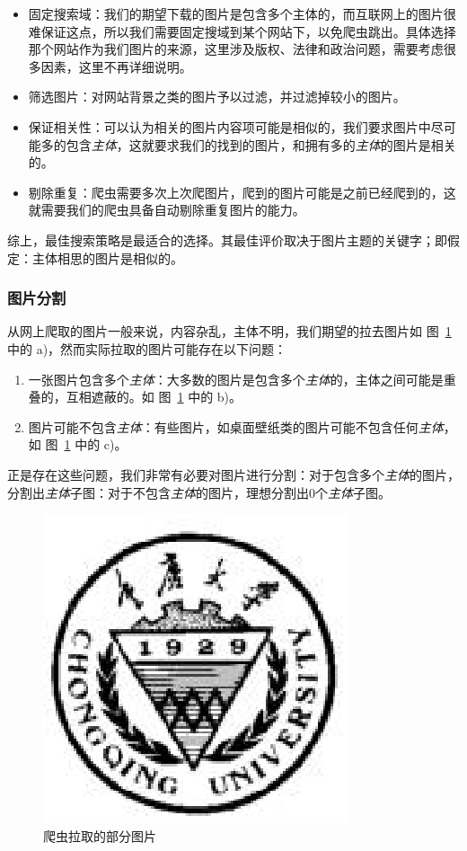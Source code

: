 \documentclass[bachelor,zhspacing]{cqu}  %
\begin{document}
\begin{itemize}
\item
  固定搜索域：我们的期望下载的图片是包含多个主体的，而互联网上的图片很难保证这点，所以我们需要固定搜域到某个网站下，以免爬虫跳出。具体选择那个网站作为我们图片的来源，这里涉及版权、法律和政治问题，需要考虑很多因素，这里不再详细说明。
\item
  筛选图片：对网站背景之类的图片予以过滤，并过滤掉较小的图片。
\item
  保证相关性：可以认为相关的图片内容项可能是相似的，我们要求图片中尽可能多的包含\emph{主体}，这就要求我们的找到的图片，和拥有多的\emph{主体}的图片是相关的。
\item
  剔除重复：爬虫需要多次上次爬图片，爬到的图片可能是之前已经爬到的，这就需要我们的爬虫具备自动剔除重复图片的能力。
\end{itemize}

综上，最佳搜索策略是最适合的选择。其最佳评价取决于图片主题的关键字；即假定：主体相思的图片是相似的。

\subsubsection{图片分割}\label{ux56feux7247ux5206ux5272}

从网上爬取的图片一般来说，内容杂乱，主体不明，我们期望的拉去图片如
图~\ref{fig:download-image} 中的
a)，然而实际拉取的图片可能存在以下问题：

\begin{enumerate}
\def\labelenumi{\arabic{enumi}.}
\item
  一张图片包含多个\emph{主体}：大多数的图片是包含多个\emph{主体}的，主体之间可能是重叠的，互相遮蔽的。如
  图~\ref{fig:download-image} 中的 b)。
\item
  图片可能不包含\emph{主体}：有些图片，如桌面壁纸类的图片可能不包含任何\emph{主体}，如
  图~\ref{fig:download-image} 中的 c)。
\end{enumerate}

正是存在这些问题，我们非常有必要对图片进行分割：对于包含多个\emph{主体}的图片，分割出\emph{主体}子图：对于不包含\emph{主体}的图片，理想分割出0个\emph{主体}子图。

\begin{figure}[htbp]
\centering
\includegraphics{pic/cqu.eps}
\caption{爬虫拉取的部分图片}\label{fig:download-image}
\end{figure}
\end{document}
